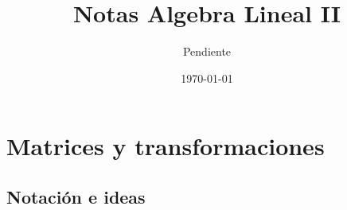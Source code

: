 \documentclass[11pt]{report}
\title{Notas Algebra Lineal II}
\author{Pendiente}
\date{\today}
\begin{document}
\maketitle

\chapter{Matrices y transformaciones}

\section{Notación e ideas}
\end{document}
